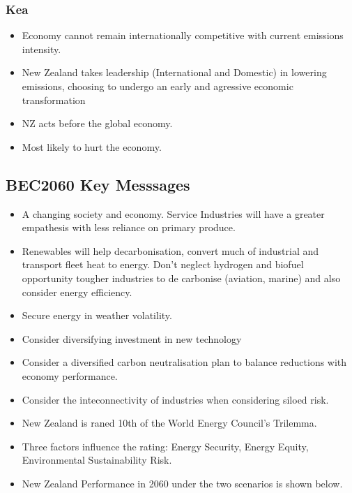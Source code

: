 \documentclass[12pt]{article}
\begin{document}
    \subsubsection{Kea}
    \begin{itemize}
        \item Economy cannot remain internationally competitive with current emissions intensity.
        \item New Zealand takes leadership (International and Domestic) in lowering emissions, choosing to
              undergo an early and agressive economic transformation 
        \item NZ acts before the global economy.
        \item Most likely to hurt the economy.
    \end{itemize}
    \subsection{BEC2060 Key Messsages}
    \begin{itemize}
        \item A changing society and economy. Service Industries will have a greater empathesis with
        less reliance on primary produce.
        \item Renewables will help decarbonisation, convert much of industrial and transport fleet heat to energy.
        Don't neglect hydrogen and biofuel opportunity tougher industries to de carbonise (aviation, marine) and
        also consider energy efficiency.
        \item Secure energy in weather volatility.
        \item Consider diversifying investment in new technology
        \item Consider a diversified carbon neutralisation plan to balance reductions with economy performance.
        \item Consider the inteconnectivity of industries when considering siloed risk.
    \end{itemize}
    \begin{itemize}
        \item New Zealand is raned 10th of the World Energy Council's Trilemma.
        \item Three factors influence the rating: Energy Security, Energy Equity, Environmental Sustainability Risk.
        \item New Zealand Performance in 2060 under the two scenarios is shown below.
    \end{itemize}
\end{document}
